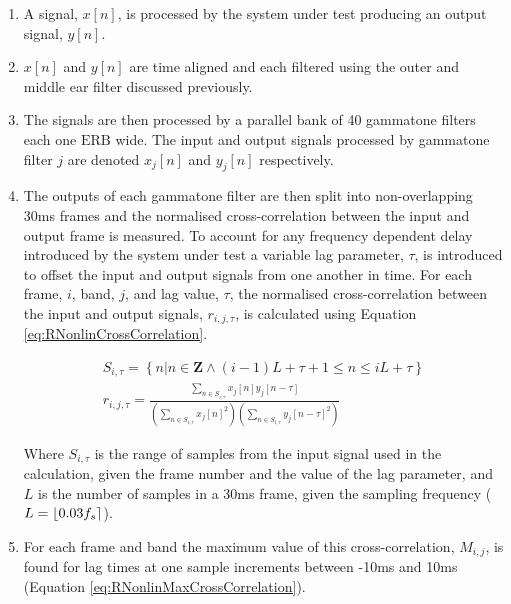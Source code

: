 		\begin{enumerate}
			\item A signal, $x[n]$, is processed by the system under test producing an output signal, $y[n]$.

			\item $x[n]$ and $y[n]$ are time aligned and each filtered using the outer and middle ear filter
				discussed previously.

			\item The signals are then processed by a parallel bank of 40 gammatone filters each one
				$\mathrm{ERB}$ wide. The input and output signals processed by gammatone filter $j$ are
				denoted $x_j[n]$ and $y_j[n]$ respectively.

			\item The outputs of each gammatone filter are then split into non-overlapping 30ms frames and the
				normalised cross-correlation between the input and output frame is measured.  To account for
				any frequency dependent delay introduced by the system under test a variable lag parameter,
				$\tau$, is introduced to offset the input and output signals from one another in time. For
				each frame, $i$, band, $j$, and lag value, $\tau$, the normalised cross-correlation between
				the input and output signals, $r_{i,j,\tau}$, is calculated using Equation
				\ref{eq:RNonlinCrossCorrelation}.

				\begin{gather}
					S_{i,\tau} = \left\{ n | n \in \textbf{Z} 
						     \land (i-1)L+\tau+1 \leq n \leq iL + \tau \right\} \nonumber \\
					r_{i,j,\tau} = \frac{\sum_{n \in S_{i,\tau}} x_{j}[n]y_{j}[n-\tau]}
						{\left( \sum_{n \in S_{i,\tau}} x_{j}[n]^{2} \right) 
						\left( \sum_{n \in S_{i,\tau}} y_{j}[n-\tau]^{2} \right)}
					\label{eq:RNonlinCrossCorrelation}
				\end{gather}

				Where $S_{i,\tau}$ is the range of samples from the input signal used in the calculation,
				given the frame number and the value of the lag parameter, and $L$ is the number of samples
				in a 30ms frame, given the sampling frequency ($L = \left\lfloor0.03f_{s}\right\rceil$). 

			\item For each frame and band the maximum value of this cross-correlation, $M_{i,j}$, is found for
				lag times at one sample increments between -10ms and 10ms (Equation
				\ref{eq:RNonlinMaxCrossCorrelation}).


\end{enumerate}
